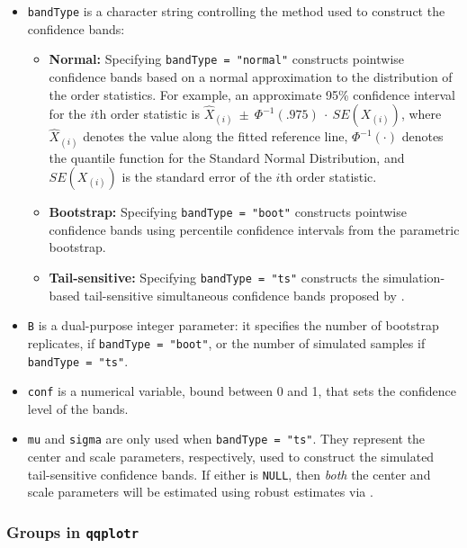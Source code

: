 \begin{itemize}
\item
  \texttt{bandType} is a character string controlling the method used to
  construct the confidence bands:

  \begin{itemize}
  \tightlist
  \item
    \textbf{Normal:} Specifying \texttt{bandType\ =\ "normal"}
    constructs pointwise confidence bands based on a normal
    approximation to the distribution of the order statistics. For
    example, an approximate 95\% confidence interval for the \(i\)th
    order statistic is
    \linebreak \(\widehat{X}_{(i)}~\pm~\Phi^{-1}(.975)~\cdot~SE(X_{(i)})\),
    where \(\widehat{X}_{(i)}\) denotes the value along the fitted
    reference line, \(\Phi^{-1}(\cdot)\) denotes the quantile function
    for the Standard Normal Distribution, and \(SE(X_{(i)})\) is the
    standard error of the \(i\)th order statistic.
  \item
    \textbf{Bootstrap:} Specifying \texttt{bandType\ =\ "boot"}
    constructs pointwise confidence bands using percentile confidence
    intervals from the parametric bootstrap.
  \item
    \textbf{Tail-sensitive:} Specifying \texttt{bandType\ =\ "ts"}
    constructs the simulation-based tail-sensitive simultaneous
    confidence bands proposed by \citet{Aldor-Noiman2013-xw}.
  \end{itemize}
\item
  \texttt{B} is a dual-purpose integer parameter: it specifies the
  number of bootstrap replicates, if \texttt{bandType\ =\ "boot"}, or
  the number of simulated samples if \texttt{bandType\ =\ "ts"}.
\item
  \texttt{conf} is a numerical variable, bound between 0 and 1, that
  sets the confidence level of the bands.
\item
  \texttt{mu} and \texttt{sigma} are only used when
  \texttt{bandType\ =\ "ts"}. They represent the center and scale
  parameters, respectively, used to construct the simulated
  tail-sensitive confidence bands. If either is \texttt{NULL}, then
  \emph{both} the center and scale parameters will be estimated using
  robust estimates via  \citep{robustbase}.
\end{itemize}

\subsubsection{\texorpdfstring{Groups in
\texttt{qqplotr}}{Groups in qqplotr}}\label{groups-in-qqplotr}

